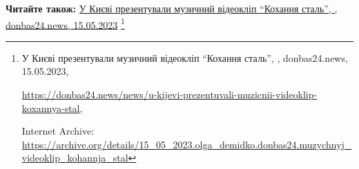  
 
 
 
 

\def\pubIA{https://archive.org/details/15_05_2023.olga_demidko.donbas24.muzychnyj_videoklip_kohannja_stal}
\def\pubTitle{У Києві презентували музичний відеокліп \enquote{Кохання сталь}}
\def\pubDate{15.05.2023}
\def\pubOrigin{https://donbas24.news/news/u-kijevi-prezentuvali-muzicnii-videoklip-koxannya-stal}
\def\pubAuthor{\pubAuthorDemidko}
\def\pubSite{donbas24.news}

\textbf{Читайте також:} \href{\pubIA}{%
\pubTitle, \pubAuthor, \pubSite, \pubDate}%
\footnote{\pubTitle, \pubAuthor, \pubSite, \pubDate, \par\url{\pubOrigin}, \par Internet Archive: \url{\pubIA}}
